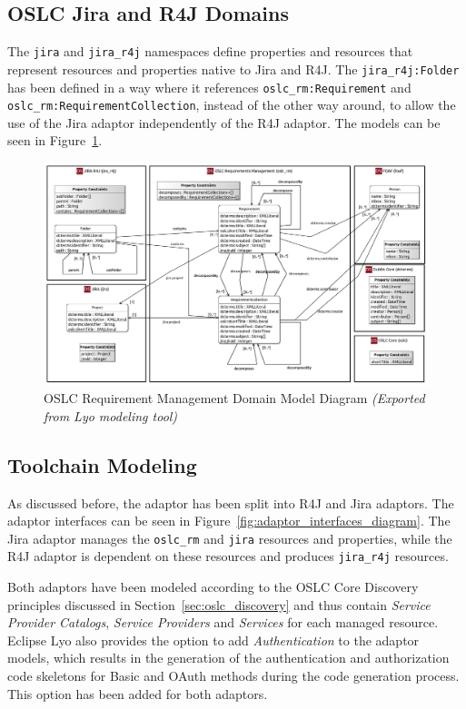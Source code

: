 \subsection*{OSLC Jira and R4J Domains}
The \texttt{jira} and \texttt{jira\_r4j} namespaces define properties and resources that represent resources and properties native to Jira and R4J. The \texttt{jira\_r4j:Folder} has been defined in a way where it references \texttt{oslc\_rm:Requirement} and \texttt{oslc\_rm:RequirementCollection}, instead of the other way around, to allow the use of the Jira adaptor independently of the R4J adaptor. The models can be seen in Figure \ref{fig:oslc_rm_domain_model_diagram}.

\begin{figure}[H]
  \centering
  \begin{sideways}
    \includegraphics[width=1.42\linewidth]{figures/Requirement_Management_Domain.jpg}
  \end{sideways}
  \caption{OSLC Requirement Management Domain Model Diagram \emph{(Exported from Lyo modeling tool)}}
  \label{fig:oslc_rm_domain_model_diagram}
\end{figure}

\subsection{Toolchain Modeling}
As discussed before, the adaptor has been split into R4J and Jira adaptors. The adaptor interfaces can be seen in Figure \ref{fig:adaptor_interfaces_diagram}. The Jira adaptor manages the \texttt{oslc\_rm} and \texttt{jira} resources and properties, while the R4J adaptor is dependent on these resources and produces \texttt{jira\_r4j} resources.

Both adaptors have been modeled according to the OSLC Core Discovery principles discussed in Section \ref{sec:oslc_discovery} and thus contain \emph{Service Provider Catalogs}, \emph{Service Providers} and \emph{Services} for each managed resource. Eclipse Lyo also provides the option to add \emph{Authentication} to the adaptor models, which results in the generation of the authentication and authorization code skeletons for Basic and OAuth methods during the code generation process. This option has been added for both adaptors.

